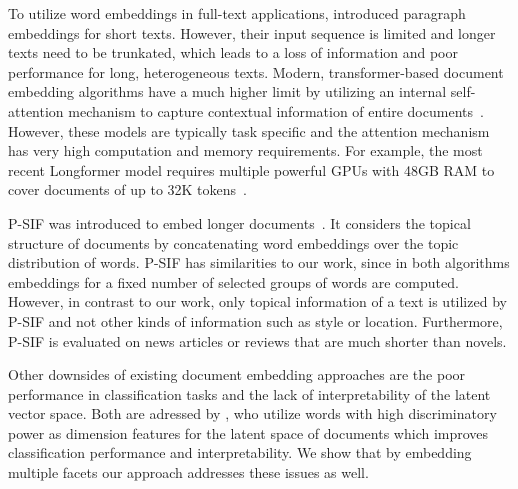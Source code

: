 \documentclass[11pt]{article}
\begin{document}
To utilize word embeddings in full-text applications, \citep{le_distributed_2014} introduced paragraph embeddings for short texts.
However, their input sequence is limited and longer texts need to be trunkated, which leads to a loss of information and poor performance for long, heterogeneous texts.
Modern, transformer-based document embedding algorithms have a much higher limit by utilizing an internal self-attention mechanism to capture contextual information of entire documents~\cite{DBLP:journals/corr/abs-1904-10509, DBLP:conf/emnlp/QiuMLYW020, DBLP:conf/iclr/KitaevKL20}.
However, these models are typically task specific and the attention mechanism has very high computation and memory requirements.
For example, the most recent Longformer model requires multiple powerful GPUs with 48GB RAM to cover documents of up to 32K tokens~\citep{beltagy_longformer_2020}.
%


{P-SIF} was introduced to embed longer documents~\citep{gupta_p-sif_2020}.
It considers the topical structure of documents by concatenating word embeddings over the topic distribution of words. 
{P-SIF} has similarities to our work, since in both algorithms embeddings for a fixed number of selected groups of words are computed. 
However, in contrast to our work, only topical information of a text is utilized by {P-SIF} and not other kinds of information such as style or location.
Furthermore, {P-SIF} is evaluated on news articles or reviews that are much shorter than novels.

Other downsides of existing document embedding approaches are the poor performance in classification tasks and the lack of interpretability of the latent vector space.
Both are adressed by \citet{unnam_document_2020}, who utilize words with high discriminatory power as dimension features for the latent space of documents which improves classification performance and interpretability.
We show that by embedding multiple facets our approach addresses these issues as well. %
\end{document}
